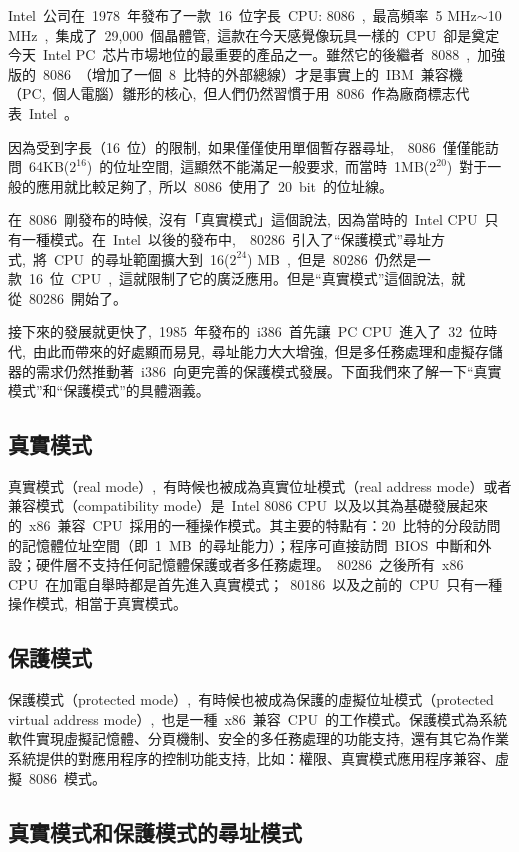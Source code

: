 Intel~公司在~1978~年發布了一款~16~位字長~CPU: 8086~,~最高頻率~5 MHz$\sim$10 MHz~,~集成了~29,000~個晶體管,~這款在今天感覺像玩具一樣的~CPU~卻是奠定今天~Intel PC~芯片市場地位的最重要的產品之一。雖然它的後繼者~8088~,~加強版的~8086~（增加了一個~8~比特的外部總線）才是事實上的~IBM~兼容機（PC,~個人電腦）雛形的核心,~但人們仍然習慣于用~8086~作為廠商標志代表~Intel~。

因為受到字長（16~位）的限制,~如果僅僅使用單個暫存器尋址,~~8086~僅僅能訪問~64KB($2^{16}$)~的位址空間,~這顯然不能滿足一般要求,~而當時~1MB($2^{20}$)~對于一般的應用就比較足夠了,~所以~8086~使用了~20~bit~的位址線。

在~8086~剛發布的時候,~沒有「真實模式」這個說法,~因為當時的~Intel CPU~只有一種模式。在~Intel~以後的發布中,~~80286~引入了“保護模式”尋址方式,~將~CPU~的尋址範圍擴大到~16($2^{24}$) MB~,~但是~80286~仍然是一款~16~位~CPU~,~這就限制了它的廣泛應用。但是“真實模式”這個說法,~就從~80286~開始了。

接下來的發展就更快了,~1985~年發布的~i386~首先讓~PC CPU~進入了~32~位時代,~由此而帶來的好處顯而易見,~尋址能力大大增強,~但是多任務處理和虛擬存儲器的需求仍然推動著~i386~向更完善的保護模式發展。下面我們來了解一下“真實模式”和“保護模式”的具體涵義。

\subsection{真實模式}

真實模式（real mode）,~有時候也被成為真實位址模式（real address mode）或者兼容模式（compatibility mode）是~Intel 8086 CPU~以及以其為基礎發展起來的~x86~兼容~CPU~採用的一種操作模式。其主要的特點有：20~比特的分段訪問的記憶體位址空間（即~1~MB~的尋址能力）；程序可直接訪問~BIOS~中斷和外設；硬件層不支持任何記憶體保護或者多任務處理。~80286~之後所有~x86 CPU~在加電自舉時都是首先進入真實模式；~80186~以及之前的~CPU~只有一種操作模式,~相當于真實模式。

\subsection{保護模式}

保護模式（protected mode）,~有時候也被成為保護的虛擬位址模式（protected virtual address mode）,~也是一種~x86~兼容~CPU~的工作模式。保護模式為系統軟件實現虛擬記憶體、分頁機制、安全的多任務處理的功能支持,~還有其它為作業系統提供的對應用程序的控制功能支持,~比如：權限、真實模式應用程序兼容、虛擬~8086~模式。

\subsection{真實模式和保護模式的尋址模式}


